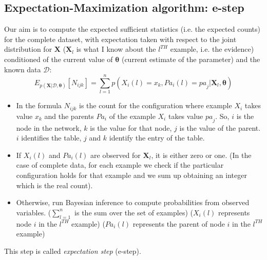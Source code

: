 \subsection{Expectation-Maximization algorithm: e-step}
Our aim is to compute the expected sufficient statistics (i.e. the expected counts)
for the complete dataset, with expectation taken with respect to the joint distribution
for $\pmb{X}$ ($\pmb{X}_{l}$ is what I know about the $l^{\mathit{TH}}$ example,
i.e. the evidence) conditioned of the current value of $\pmb{\theta}$ (current
estimate of the parameter) and the known data $\mathcal{D}$:
\begin{equation}
	E_{p(\pmb{X}|\mathcal{D}, \pmb{\theta})}[N_{ijk}] = \sum_{l=1}^{n} p(X_{i}(l) =
	x_{k}, \mathit{Pa}_{i}(l) = \mathit{pa}_{j} | \pmb{X}_{l}, \pmb{\theta})
\end{equation}
\begin{itemize}
	\item In the formula $N_{ijk}$ is the count for the configuration where example
		$X_{i}$ takes value $x_{k}$ and the parents $\mathit{Pa}_{i}$ of the example
		$X_{i}$ takes value $\mathit{pa}_{j}$. So, $i$ is the node in the network,
		$k$ is the value for that node, $j$ is the value of the parent. $i$
		identifies the table, $j$ and $k$ identify the entry of the table.

	\item If $X_{i}(l)$ and $\mathit{Pa}_{i}(l)$ are observed for $\pmb{X}_{l}$,
		it is either zero or one. (In the case of complete data, for each example we
		check if the particular configuration holds for that example and we sum up obtaining
		an integer which is the real count).

	\item Otherwise, run Bayesian inference to compute probabilities from observed
		variables. ($\sum_{l=1}^{n}$ is the sum over the set of examples) ($X_{i}(l)$
		represents node $i$ in the $l^{\mathit{TH}}$ example) ($\mathit{Pa}_{i}(l)$
		represents the parent of node $i$ in the $l^{\mathit{TH}}$ example)
\end{itemize}

This step is called \textit{expectation step} (e-step).

